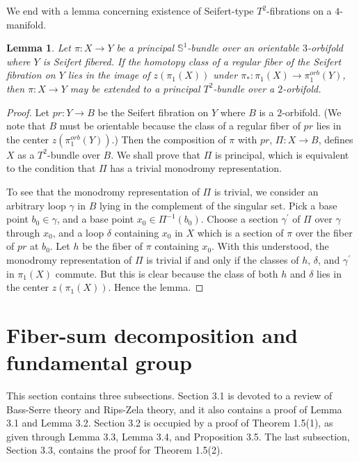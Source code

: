 \documentclass[11pt]{amsart}
\theoremstyle{plain}
\numberwithin{theorem}{section}
\newtheorem{lemma}[theorem]{Lemma}
\theoremstyle{definition}
\begin{document}
We end with a lemma concerning existence of Seifert-type $T^2$-fibrations on a $4$-manifold.

\begin{lemma}
Let $\pi: X\rightarrow Y$ be a principal ${{\mathbb S}}^1$-bundle over an orientable $3$-orbifold where 
$Y$ is Seifert fibered. If the homotopy class of a regular fiber of the Seifert fibration on $Y$ lies 
in the image of $z(\pi_1(X))$ under $\pi_\ast: \pi_1(X)\rightarrow \pi_1^{orb}(Y)$, then 
$\pi:X\rightarrow Y$ may be extended to a principal $T^2$-bundle over a $2$-orbifold. 
\end{lemma}

\begin{proof}
Let $pr:Y\rightarrow B$ be the Seifert fibration on $Y$ where $B$ is a $2$-orbifold. (We note 
that $B$ must be orientable because the class of a regular fiber of $pr$ lies in the center $z(\pi_1^{orb}(Y))$.) Then the composition of $\pi$ with $pr$, $\Pi:X\rightarrow B$, defines $X$ 
as a $T^2$-bundle over $B$. We shall prove that $\Pi$ is principal, which is equivalent to the condition that $\Pi$ has a trivial monodromy representation. 

To see that the monodromy representation of $\Pi$ is trivial, we consider an arbitrary loop $\gamma$
in $B$ lying in the complement of the singular set. Pick a base point $b_0\in \gamma$, and a base
point $x_0\in \Pi^{-1}(b_0)$.  Choose a section $\gamma^\prime$ of $\Pi$ over $\gamma$ through 
$x_0$, and a loop $\delta$ containing $x_0$ in $X$ which is a section of $\pi$ over the fiber of $pr$
at $b_0$. Let $h$ be the fiber of $\pi$ containing $x_0$. With this understood, the monodromy representation of $\Pi$ is trivial if and only if the classes of $h$, $\delta$, and $\gamma^\prime$
in $\pi_1(X)$ commute. But this is clear because the class of both $h$ and $\delta$ lies in 
the center $z(\pi_1(X))$. Hence the lemma. 

\end{proof}

\section{Fiber-sum decomposition and fundamental group}

This section contains three subsections. Section 3.1 is devoted to a review of Bass-Serre theory and
Rips-Zela theory, and it also contains a proof of Lemma 3.1 and Lemma 3.2. Section 3.2 is occupied by a proof of Theorem 1.5(1), as given through Lemma 3.3, Lemma 3.4, and Proposition 3.5. The last
subsection, Section 3.3, contains the proof for Theorem 1.5(2). 
\end{document}
